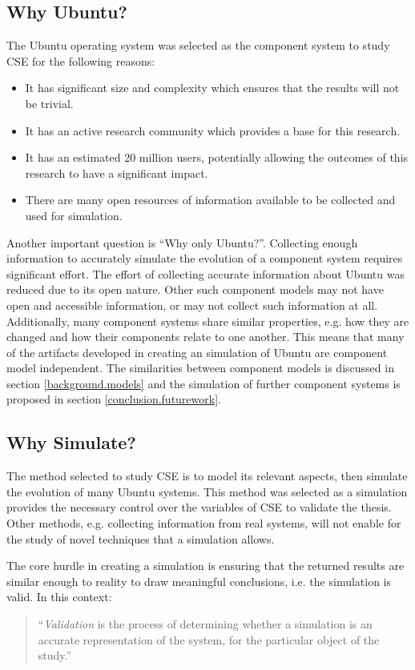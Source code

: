 \subsection{Why Ubuntu?}
The Ubuntu operating system was selected as the component system to study CSE for the following reasons:
\begin{itemize}
  \item It has significant size and complexity which ensures that the results will not be trivial.
  \item It has an active research community which provides a base for this research.
  \item It has an estimated 20 million users, potentially allowing the outcomes of this research to have a significant impact.
  \item There are many open resources of information available to be collected and used for simulation.
\end{itemize} 
Another important question is ``Why only Ubuntu?''.
Collecting enough information to accurately simulate the evolution of a component system requires significant effort.
The effort of collecting accurate information about Ubuntu was reduced due to its open nature.
Other such component models may not have open and accessible information, or may not collect such information at all.
Additionally, many component systems share similar properties, e.g. how they are changed and how their components relate to one another.
This means that many of the artifacts developed in creating an simulation of Ubuntu are component model independent.
The similarities between component models is discussed in section \ref{background.models} and the simulation of further component systems is proposed in section \ref{conclusion.futurework}.
 
\subsection{Why Simulate?}
The method selected to study CSE is to model its relevant aspects, then simulate the evolution of many Ubuntu systems.
This method was selected as a simulation provides the necessary control over the variables of CSE to validate the thesis.
Other methods, e.g. collecting information from real systems, will not enable for the study of novel techniques that a simulation allows.

The core hurdle in creating a simulation is ensuring that the returned results are similar enough to reality to draw meaningful conclusions, i.e. the simulation is valid.
In this context:
\begin{quotation}
``\textit{Validation} is the process of determining whether a simulation is an accurate representation of the system, for the particular object of the study.'' \citep{Law2005}
\end{quotation}

